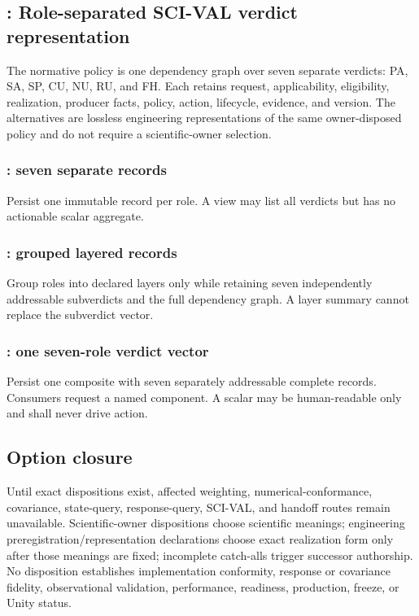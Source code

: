 \subsection{: Role-separated SCI-VAL verdict representation}

The normative policy is one dependency graph over seven separate verdicts:
PA, SA, SP, CU, NU, RU, and FH. Each retains request, applicability,
eligibility, realization, producer facts, policy, action, lifecycle, evidence,
and version. The alternatives are lossless engineering representations of the
same owner-disposed policy and do not require a scientific-owner selection.

\subsubsection{: seven separate records}
Persist one immutable record per role. A view may list all verdicts but has no
actionable scalar aggregate.

\subsubsection{: grouped layered records}
Group roles into declared layers only while retaining seven independently
addressable subverdicts and the full dependency graph. A layer summary cannot
replace the subverdict vector.

\subsubsection{: one seven-role verdict vector}
Persist one composite with seven separately addressable complete records.
Consumers request a named component. A scalar may be human-readable only and
shall never drive action.

\subsection{Option closure}

Until exact dispositions exist, affected weighting, numerical-conformance,
covariance, state-query, response-query, SCI-VAL, and handoff routes remain
unavailable. Scientific-owner dispositions choose scientific meanings;
engineering preregistration/representation declarations choose exact
realization form only after those meanings are fixed; incomplete catch-alls
trigger successor authorship. No disposition establishes implementation conformity, response or
covariance fidelity, observational validation, performance, readiness,
production, freeze, or Unity status.
